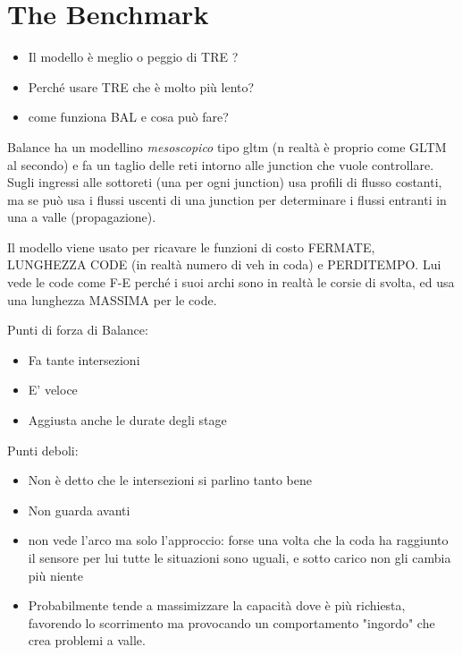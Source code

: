 \chapter{The Benchmark}

\begin{itemize}
\item Il modello è meglio o peggio di TRE ?
\item Perché usare TRE che è molto più lento?
\item come funziona BAL e cosa può fare?
\end{itemize}

Balance ha un modellino \emph{mesoscopico} tipo gltm (n realtà è proprio come GLTM al secondo) e fa un taglio delle reti intorno alle junction che vuole controllare. Sugli ingressi alle sottoreti (una per ogni junction) usa profili di flusso costanti, ma se può usa i flussi uscenti di una junction per determinare i flussi entranti in una a valle (propagazione).

Il modello viene usato per ricavare le funzioni di costo FERMATE, LUNGHEZZA CODE (in realtà numero di veh in coda) e PERDITEMPO.
Lui vede le code come F-E perché i suoi archi sono in realtà le corsie di svolta, ed usa una lunghezza MASSIMA per le code.

Punti di forza di Balance:
\begin{itemize}
\item Fa tante intersezioni
\item E' veloce
\item Aggiusta anche le durate degli stage
\end{itemize}

Punti deboli:
\begin{itemize}
\item Non è detto che le intersezioni si parlino tanto bene
\item Non guarda avanti
\item non vede l'arco ma solo l'approccio: forse una volta che la coda ha raggiunto il sensore per lui tutte le situazioni sono uguali, e sotto carico non gli cambia più niente
\item Probabilmente tende a massimizzare la capacità dove è più richiesta, favorendo lo scorrimento ma provocando un comportamento "ingordo" che crea problemi a valle.
\end{itemize}

